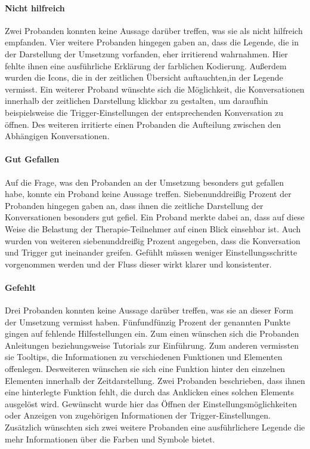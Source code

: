\paragraph{Nicht hilfreich}Zwei Probanden konnten keine Aussage darüber treffen, was sie als nicht hilfreich empfanden. Vier weitere Probanden hingegen gaben an, dass die Legende, die in der Darstellung der Umsetzung vorfanden, eher irritierend wahrnahmen. Hier fehlte ihnen eine ausführliche Erklärung der farblichen Kodierung. Außerdem wurden die Icons, die in der zeitlichen Übersicht auftauchten,in der Legende vermisst. Ein weiterer Proband wünschte sich die Möglichkeit, die Konversationen innerhalb der zeitlichen Darstellung klickbar zu gestalten, um daraufhin beispielsweise die Trigger-Einstellungen der entsprechenden Konversation zu öffnen. Des weiteren irritierte einen Probanden die Aufteilung zwischen den Abhängigen Konversationen.

\paragraph{Gut Gefallen} Auf die Frage, was den Probanden an der Umsetzung besonders gut gefallen habe, konnte ein Proband keine Aussage treffen. Siebenunddreißig Prozent der Probanden hingegen gaben an, dass ihnen die zeitliche Darstellung der Konversationen besonders gut gefiel. Ein Proband merkte dabei an, dass auf diese Weise die Belastung der Therapie-Teilnehmer auf einen Blick  einsehbar ist. Auch wurden von weiteren siebenunddreißig Prozent angegeben, dass die Konversation und Trigger gut ineinander greifen. Gefühlt müssen weniger Einstellungsschritte vorgenommen werden und der Fluss dieser wirkt klarer und konsistenter.

\paragraph{Gefehlt} Drei Probanden konnten keine Aussage darüber treffen, was sie an dieser Form der Umsetzung vermisst haben. Fünfundfünzig Prozent der genannten Punkte gingen auf fehlende Hilfestellungen ein. Zum einen wünschen sich die Probanden Anleitungen beziehungsweise Tutorials zur Einführung. Zum anderen vermissten sie Tooltips, die Informationen zu verschiedenen Funktionen und Elementen offenlegen. Desweiteren wünschen sie sich eine Funktion hinter den einzelnen Elementen innerhalb der Zeitdarstellung. Zwei Probanden beschrieben, dass ihnen eine hinterlegte Funktion fehlt, die durch das Anklicken eines solchen Elements ausgelöst wird. Gewünscht wurde hier das Öffnen der Einstellungsmöglichkeiten oder Anzeigen von zugehörigen Informationen der Trigger-Einstellungen. Zusätzlich wünschten sich zwei weitere Probanden eine ausführlichere Legende die mehr Informationen über die Farben und Symbole bietet.

